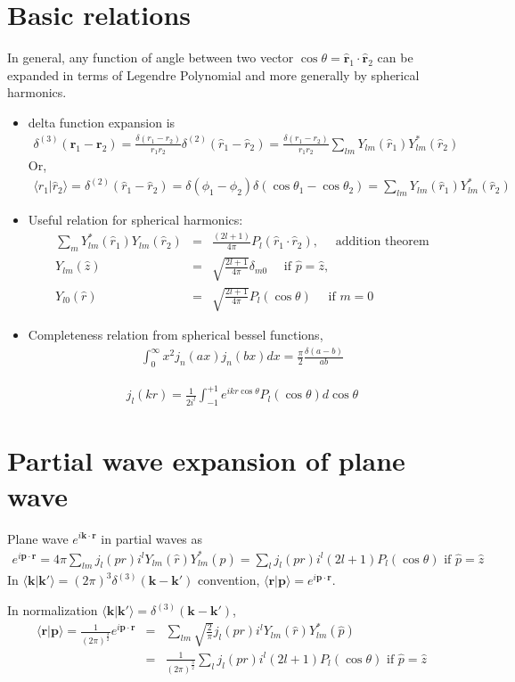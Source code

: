 \documentclass[10pt]{book}
\def\bm{\boldsymbol}
\newcommand{\bea}{\begin{eqnarray}}
\newcommand{\eea}{\end{eqnarray}}
\newcommand{\no}{\nonumber \\}
\def\vp{{\bm p}}
\def\vk{{\bm k}}
\def\vr{{\bm r}}
\def\la{\langle}
\def\ra{\rangle}
\begin{document}
\section{Basic relations}
In general, any function of angle between two vector $\cos\theta=\hat{\vr}_1\cdot\hat{\vr}_2$
can be expanded in terms of Legendre Polynomial and
more generally by spherical harmonics.
\begin{itemize}
\item delta function expansion is
\bea
\boxed{
\delta^{(3)}(\vr_1-\vr_2)=
 \frac{\delta(r_1-r_2)}{r_1 r_2}\delta^{(2)}(\hat{r}_1-\hat{r}_2)
 = 
 \frac{\delta(r_1-r_2)}{r_1 r_2}
 \sum_{lm} Y_{lm}(\hat{r}_1)Y^*_{lm}(\hat{r}_2) }
\eea
Or,
\bea
\la \hat{r}_1|\hat{r}_2\ra=\delta^{(2)}(\hat{r}_1-\hat{r}_2)
 =\delta(\phi_1-\phi_2)\delta(\cos\theta_1-\cos\theta_2)
=\sum_{lm} Y_{lm}(\hat{r}_1)Y^*_{lm}(\hat{r}_2)
\eea 
\item Useful relation for spherical harmonics:
\bea
\sum_{m} Y_{lm}^*(\hat{r}_1) Y_{lm}(\hat{r}_2)&=&
\frac{(2l+1)}{4\pi }P_l(\hat{r}_1\cdot\hat{r}_2),
 \quad \mbox{ addition theorem} \no   
Y_{lm}(\hat{z})&=&\sqrt{\frac{2l+1}{4\pi}}\delta_{m0}
       \quad \mbox{ if $\hat{p}=\hat{z}$},\no 
Y_{l0}(\hat{r})&=&\sqrt{\frac{2l+1}{4\pi}} P_l(\cos\theta)
       \quad \mbox{ if $m=0$}
\eea

\item  Completeness relation from spherical bessel functions,
\bea
\boxed{
\int_0^\infty x^2 j_n(a x) j_n(b x)dx
=\frac{\pi}{2}\frac{\delta(a-b)}{ab}}
\eea

\bea 
j_l(kr)=\frac{1}{2i^l}\int_{-1}^{+1} e^{ikr\cos\theta} P_l(\cos\theta)d\cos\theta 
\eea 

\end{itemize}

\section{Partial wave expansion of plane wave}
Plane wave $e^{i\vk\cdot\vr}$ in partial waves as
\bea
\boxed{e^{i\vp\cdot\vr}
=4\pi \sum_{lm} j_l(pr) i^l Y_{lm}(\hat{r})Y^*_{lm}(\hat{p})
=\sum_l j_l(pr)i^l (2l+1) P_l(\cos\theta)
\mbox{ if } \hat{p}=\hat{z} }
\eea
In $\la \vk|\vk'\ra=(2\pi)^3\delta^{(3)}(\vk-\vk')$
convention, $\la \vr|\vp\ra=e^{i\vp\cdot\vr}$.

In normalization $\la \vk|\vk'\ra=\delta^{(3)}(\vk-\vk') $,
\bea
\la \vr|\vp\ra=\frac{1}{(2\pi)^{\frac{3}{2}}}e^{i\vp\cdot\vr}
&=& \sum_{lm} \sqrt{\frac{2}{\pi}} j_l(pr) i^l Y_{lm}(\hat{r})Y^*_{lm}(\hat{p}) \no
&=& \frac{1}{(2\pi)^{\frac{3}{2}}}
\sum_{l}j_l(pr) i^l(2l+1) P_{l}(\cos\theta) 
\mbox{ if $\hat{p}=\hat{z}$}
\eea
\end{document}
